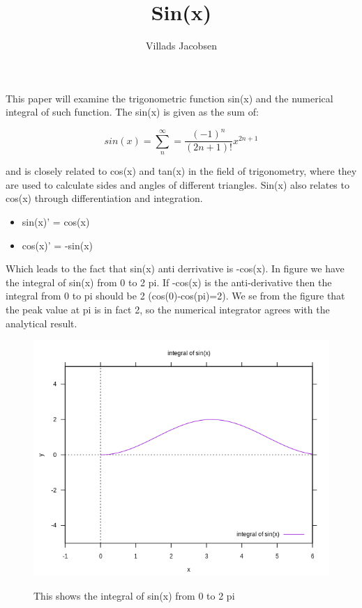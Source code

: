 \documentclass{article}
\title{Sin(x) }
\author{Villads Jacobsen}
\begin{document}
\maketitle

This paper will examine the trigonometric function sin(x) and the numerical integral of such function.
The sin(x) is given as the sum of:


\begin{equation}
sin(x)=\sum_n^{\infty} =\frac{(-1)^n}{(2n+1)!}x^{2n+1}
\end{equation}

and is closely related to cos(x) and tan(x) in the field of trigonometry, where they are used to
calculate sides and angles of different triangles. Sin(x) also relates to cos(x) through differentiation and integration.

\begin{itemize}
 \item sin(x)' = cos(x) 
 \item cos(x)' = -sin(x)
\end{itemize}

Which leads to the fact that sin(x) anti derrivative is -cos(x). In figure \cite{fig:sinusintegral} we have the integral of
sin(x) from 0 to 2 pi. If -cos(x) is the anti-derivative then the integral from 0 to pi should be 2 (cos(0)-cos(pi)=2). We se from the figure that
the peak value at pi is in fact 2, so the numerical integrator agrees with the analytical result.


\begin{figure}
\caption{This shows the integral of sin(x) from 0 to 2 pi}
\includegraphics[width=\columnwidth]{plot.png}
\label{fig:sinusintegral}
\end{figure}
\end{document}
